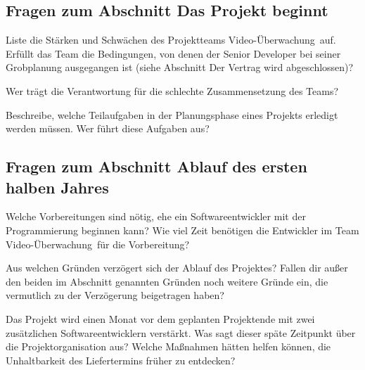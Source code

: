 \subsection*{Fragen zum Abschnitt \glqq Das Projekt beginnt\grqq}
\begin{compactenum}[a)]
\item Liste die Stärken und Schwächen des Projektteams \glqq Video-Überwachung\grqq\ auf.
Erfüllt das Team die Bedingungen, von denen der Senior Developer bei seiner
Grobplanung ausgegangen ist (siehe Abschnitt \glqq Der Vertrag wird
abgeschlossen\grqq )?
\item Wer trägt die Verantwortung für die schlechte Zusammensetzung des Teams?
\item Beschreibe, welche Teilaufgaben in der Planungsphase eines Projekts
erledigt werden müssen. Wer führt diese Aufgaben aus?
\end{compactenum}

\subsection*{Fragen zum Abschnitt \glqq Ablauf des ersten halben Jahres\grqq}
\begin{compactenum}[a)]
\item Welche Vorbereitungen sind nötig, ehe ein Softwareentwickler mit der
Programmierung beginnen kann? Wie viel Zeit benötigen die Entwickler im Team
\glqq Video-Überwachung\grqq\ für die Vorbereitung?
\item Aus welchen Gründen verzögert sich der Ablauf des Projektes? Fallen dir
außer den beiden im Abschnitt genannten Gründen noch weitere Gründe ein, die
vermutlich zu der Verzögerung beigetragen haben?
\item Das Projekt wird einen Monat vor dem geplanten Projektende mit zwei
zusätzlichen Softwareentwicklern verstärkt. Was sagt dieser späte Zeitpunkt
über die Projektorganisation aus? Welche Maßnahmen hätten helfen können, die
Unhaltbarkeit des Liefertermins früher zu entdecken?
\end{compactenum}

